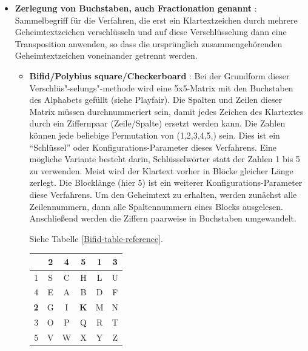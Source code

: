 \begin{refsegment}
\begin{itemize}
\item {\bf Zerlegung von Buchstaben, auch Fractionation genannt}
   \cite{Savard1999}: Sammelbegriff für die Verfahren, die erst ein
   Klartextzeichen durch mehrere Geheimtextzeichen verschlüsseln und auf
   diese Verschlüsselung dann eine Transposition anwenden, so dass die
   ursprünglich zusammengehörenden Geheimtextzeichen voneinander getrennt
   werden.

   \begin{itemize}
      \item {\bf Bifid/Polybius square/Checkerboard} \cite{Goebel2014}:
         Bei der Grundform dieser Verschlüs"-selungs"-methode wird eine
         5x5-Matrix
         mit den Buchstaben des Alphabets gefüllt (siehe Playfair). Die
         Spalten und Zeilen dieser Matrix müssen durchnummeriert sein, damit
         jedes Zeichen des Klartextes durch ein Ziffernpaar (Zeile/Spalte)
         ersetzt werden kann. Die Zahlen können jede beliebige Permutation
         von (1,2,3,4,5,) sein. Dies ist ein "`Schlüssel"' oder
         Konfigurations-Parameter dieses Verfahrens. Eine mögliche Variante
         besteht darin, Schlüsselwörter statt der Zahlen 1 bis 5
         zu verwenden.
	 Meist wird der Klartext vorher in Blöcke gleicher Länge
         zerlegt. Die Blocklänge (hier 5) ist ein weiterer
         Konfigurations-Parameter diese Verfahrens. Um den Geheimtext zu
         erhalten, werden zunächst alle Zeilennummern, dann alle
         Spaltennummern eines Blocks ausgelesen.
         Anschließend werden die Ziffern paarweise in Buchstaben umgewandelt.


         Siehe Tabelle \ref{Bifid-table-reference}.

         \begin{table}[ht]

         \begin{center}
         \begin{tabular}{|c|ccccc|}
         \hline
            & 2 & 4 & {\bf 5} & 1 & 3\\
         \hline
          1 & S & C & H & L & U\\
          4 & E & A & B & D & F\\
	  {\bf 2} & G & I & {\bf K} & M & N\\
          3 & O & P & Q & R & T\\
          5 & V & W & X & Y & Z\\
         \hline
         \end{tabular}
         \end{center}


\end{table}
\end{itemize}
\end{itemize}
\end{refsegment}
